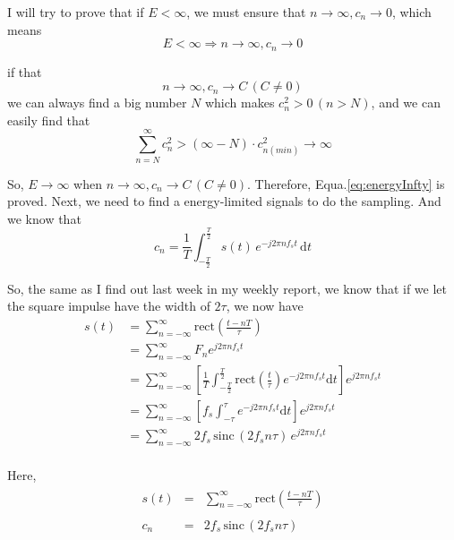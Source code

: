 \documentclass{article}
\begin{document}
I will try to prove that if $E < \infty$, we must ensure that $n \to \infty, c_n \to 0$, which means 
\begin{equation}
E < \infty \Rightarrow  n \to \infty, c_n \to 0
\label{eq:energyInfty}
\end{equation}

if that
$$
n  \to \infty, c_n \to C \, (C \neq 0)
$$
we can always find a big number $N$ which makes $c_n^2 > 0 \, (n > N) $, and we can easily find that
$$
\sum_{n = N}^{\infty} c_n^2 > (\infty - N) \cdot c^2_{n(min)} \to \infty
$$

So, $E\to \infty$ when $n  \to \infty, c_n \to C \, (C \neq 0)$.
Therefore, Equa.\ref{eq:energyInfty} is proved. Next, we need to find a energy-limited signals to do the sampling.
And we know that
\begin{equation*}
    c_n = \frac{1}{T} \int_{-\frac{T}{2}}^{\frac{T}{2}} s(t) \, e^{-j2\pi n f_s t} \, \mathrm{d}t
\end{equation*}

So, the same as I find out last week in my weekly report, we know that if we let the square impulse have the width of $2\tau$, we now have
\begin{equation}
    \begin{aligned} s(t) & = \sum_{n = -\infty}^{\infty} \mathrm{rect} (\frac{t - nT}{\tau}) \\
             & = \sum_{n =-\infty}^{\infty}F_n e^{j2 \pi n f_s t}  \\
             & = \sum_{n = -\infty}^{\infty}\left[ \frac{1}{T} \int_{-\frac T2}^{\frac T2}
              \mathrm{rect}(\frac{t}{\tau}) e^{-j2 \pi n f_s t} \mathrm{d}t \right] e^{j2 \pi n f_s t} \\
             & = \sum_{n = -\infty}^{\infty}\left[ f_s \int_{-\tau}^{\tau} e^{-j2 \pi n f_s t} \mathrm{d}t \right] e^{j2 \pi n f_s t}  \\
             & = \sum_{n = -\infty}^{\infty}2f_s\, \mathrm{sinc} \,( 2f_s n\tau)\, e^{j2 \pi n f_s t} \\
             \label{eq:samplingSquare}
    \end{aligned}
\end{equation}

Here, 
\begin{align*}
\begin{array}{lrl}
s(t) &=& \sum\limits_{n = -\infty}^{\infty} \mathrm{rect} (\frac{t - nT}{\tau}) \\ \\
c_n  &=& 2f_s\, \mathrm{sinc} \,( 2f_s n\tau)
\end{array}
\end{align*}  
\end{document}
